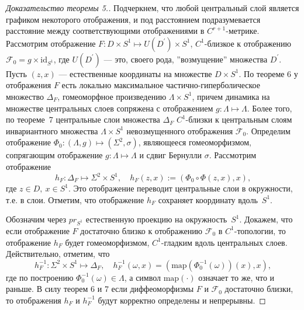\documentclass[12pt]{article}
\begin{document}
\begin{proof}[Доказательство теоремы 5.]
Подчеркнем, что любой центральный слой является графиком некоторого отображения, и под расстоянием подразумевается расстояние между соответствующими отображениями в $C^{r+1}$-метрике.%
 Рассмотрим отображение $F:D\times S^1\mapsto U(D^{\prime})\times S^1$, $C^1$-близкое к отображению $\mathcal{F}_0=g\times\mbox{id}_{S^1}$, где $U(D^{\prime})$ --- это, своего рода, ''возмущение'' множества $D^{\prime}$. Пусть $(z,x)$ --- естественные координаты на множестве $D\times S^1$. По теореме 6 у отображения $F$ есть локально максимальное частично-гиперболическое множество $\Delta_F$, гомеоморфное произведению $\Lambda\times S^1$, причем динамика на множестве центральных слоев сопряжена с отображением $g:\Lambda\mapsto\Lambda$. Более того, по теореме~7 центральные слои множества $\Delta_F$ $C^1$-близки к центральным слоям инвариантного множества $\Lambda\times S^1$ невозмущенного отображения $\mathcal F_0$. Определим отображение $\Phi_0:(\Lambda,g)\mapsto(\Sigma^2,\sigma)$, являющееся гомеоморфизмом, сопрягающим отображение $g:\Lambda\mapsto\Lambda$ и  сдвиг Бернулли $\sigma$. Рассмотрим отображение
$$h_{F}:\Delta_{F}\mapsto\Sigma^2\times S^1,\quad h_F(z,x):=(\Phi_0\circ\Phi(z,x),x),$$
где $z\in D,\ x\in S^1$. Это отображение переводит центральные слои в окружности, т.е. в слои. Отметим, что отображение $h_F$ сохраняет координату вдоль~$S^1$.

 Обозначим через $pr_{S^1}$ естественную проекцию на окружность~$S^1$. Докажем, что если отображение $F$ достаточно близко к отображению $\mathcal F_0$ в $C^1$-топологии, то отображение
$h_F$
будет гомеоморфизмом, $C^1$-гладким вдоль центральных слоев. Действительно, отметим, что
$$h_F^{-1}:\Sigma^2\times S^1\mapsto\Delta_F,\quad h_F^{-1}(\omega,x)=(\mbox{map}(\Phi_0^{-1}(\omega))(x),x),$$
где по построению $\Phi_0^{-1}(\omega)\in\Lambda$, а символ $\textrm{map}(\cdot)$ означает то же, что и раньше.
В силу теорем 6 и 7 если диффеоморфизмы $F$ и $\mathcal{F}_0$ достаточно близки, то отображения $h_F$ и $h_F^{-1}$ будут корректно определены и непрерывны.


\end{proof}
\end{document}
